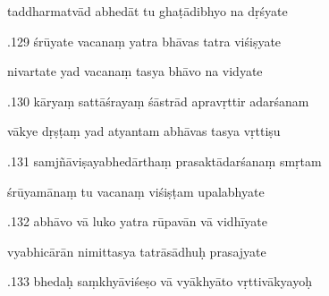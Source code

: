 \documentclass[article,12pt,a4paper]{memoir}%
\newcounter{parCount}
\begin{document}
	  
	  \pstart \leavevmode%
	taddharmatvād abhedāt tu ghaṭādibhyo na dṛśyate 
	{}
	\pend%
      

	  
	  \pstart {}.129 śrūyate vacanaṃ yatra bhāvas tatra viśiṣyate 
	{}
	\pend%
      

	  
	  \pstart \leavevmode%
	nivartate yad vacanaṃ tasya bhāvo na vidyate 
	{}
	\pend%
      

	  
	  \pstart {}.130 kāryaṃ sattāśrayaṃ śāstrād apravṛttir adarśanam 
	{}
	\pend%
      

	  
	  \pstart \leavevmode%
	vākye dṛṣṭaṃ yad atyantam abhāvas tasya vṛttiṣu 
	{}
	\pend%
      

	  
	  \pstart {}.131 samjñāviṣayabhedārthaṃ prasaktādarśanaṃ smṛtam 
	{}
	\pend%
      

	  
	  \pstart \leavevmode%
	śrūyamānaṃ tu vacanaṃ viśiṣṭam upalabhyate 
	{}
	\pend%
      

	  
	  \pstart {}.132 abhāvo vā luko yatra rūpavān vā vidhīyate 
	{}
	\pend%
      

	  
	  \pstart \leavevmode%
	vyabhicārān nimittasya tatrāsādhuḥ prasajyate 
	{}
	\pend%
      

	  
	  \pstart {}.133 bhedaḥ saṃkhyāviśeṣo vā vyākhyāto vṛttivākyayoḥ 
	{}
	\pend%
      
\end{document}
